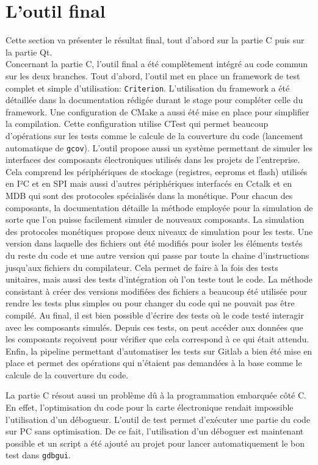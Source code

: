 \documentclass[a4paper]{article}
\begin{document}
\section{L'outil final}

Cette section va présenter le résultat final, tout d'abord sur la partie C puis
sur la partie Qt.\\

Concernant la partie C, l'outil final a été complètement intégré au code commun
sur les deux branches. Tout d'abord, l'outil met en place un framework de test
complet et simple d'utilisation: \verb|Criterion|. L'utilisation du framework a
été détaillée dans la documentation rédigée durant le stage pour compléter celle
du framework. Une configuration de CMake a aussi été mise en place pour
simplifier la compilation. Cette configuration utilise CTest qui permet beaucoup
d'opérations sur les tests comme le calcule de la couverture du code (lancement
automatique de \verb|gcov|). L'outil propose aussi un système permettant de
simuler les interfaces des composants électroniques utilisés dans les projets de
l'entreprise. Cela comprend les périphériques de stockage (registres, eeproms et
flash) utilisés en I²C et en SPI mais aussi d'autres périphériques interfacés en
Cctalk et en MDB qui sont des protocoles spécialisés dans la monétique. Pour
chacun des composants, la documentation détaille la méthode employée pour la
simulation de sorte que l'on puisse facilement simuler de nouveaux
composants. La simulation des protocoles monétiques propose deux niveaux de
simulation pour les tests. Une version dans laquelle des fichiers ont été modifiés pour
isoler les éléments testés du reste du code et une autre version qui passe par
toute la chaine d'instructions jusqu'aux fichiers du compilateur. Cela permet de
faire à la fois des tests unitaires, mais aussi des tests d'intégration où l'on
teste tout le code. La méthode consistant à créer des versions modifiées des
fichiers a beaucoup été utilisée pour rendre les tests plus simples ou pour
changer du code qui ne pouvait pas être compilé. Au final, il est bien possible
d'écrire des tests où le code testé interagir avec les composants simulés.
Depuis ces tests, on peut accéder aux données que les composants reçoivent pour
vérifier que cela correspond à ce qui était attendu. Enfin, la pipeline
permettant d'automatiser les tests sur Gitlab a bien été mise en place et permet
des opérations qui n'étaient pas demandées à la base comme le calcule de la
couverture du code.

La partie C résout aussi un problème dû à la programmation embarquée côté C. En
effet, l'optimisation du code pour la carte électronique rendait impossible
l'utilisation d'un débogueur. L'outil de test permet d'exécuter une partie du
code sur PC sans optimisation. De ce fait, l'utilisation d'un déboguer est
maintenant possible et un script a été ajouté au projet pour lancer
automatiquement le bon test dans \verb|gdbgui|.
\end{document}

